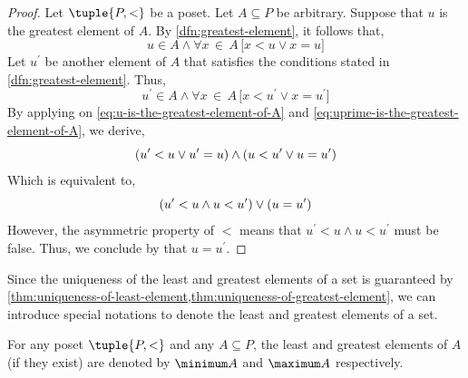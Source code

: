 \begin{proof}
    Let \( \tuple{P, <} \) be a poset. Let \( A \subseteq P \) be arbitrary. Suppose that \( u \) is the greatest element of \( A \).
    By \cref{dfn:greatest-element}, it follows that,
    \begin{equation}
        \label{eq:u-is-the-greatest-element-of-A}
        u \in A \land \forall x\,{\in}\,A \, \big[ x < u \lor x = u \big]
    \end{equation}
    Let \( u^{\prime} \) be another element of \( A \) that satisfies the conditions stated in \cref{dfn:greatest-element}. Thus,
    \begin{equation}
        \label{eq:uprime-is-the-greatest-element-of-A}
        u^{\prime} \in A \land \forall x\,{\in}\,A \, \big[ x < u^{\prime} \lor x = u^{\prime} \big]
    \end{equation}
    By applying  on \eqref{eq:u-is-the-greatest-element-of-A} and \eqref{eq:uprime-is-the-greatest-element-of-A},
    we derive,
    \begin{equation*}
        \mleft( u^{\prime} < u \lor u^{\prime} = u \mright) \land \mleft( u < u^{\prime} \lor u = u^{\prime} \mright)
    \end{equation*}
    Which is equivalent to,
    \begin{equation*}
        \mleft( u^{\prime} < u \land u < u^{\prime} \mright) \lor \mleft( u = u^{\prime} \mright)
    \end{equation*}
    However, the asymmetric property of \( < \) means that \( u^{\prime} < u \land u < u^{\prime} \) must be false. Thus, we conclude
    by  that \( u = u^{\prime} \).
\end{proof}

\vspace{0.2cm}
\noindent
Since the uniqueness of the least and greatest elements of a set is guaranteed by
\cref{thm:uniqueness-of-least-element,thm:uniqueness-of-greatest-element},
we can introduce special notations to denote the least and greatest elements of a set.

\begin{dfn}
    \label{dfn:least-element-notation}
    For any poset \( \tuple{P, <} \) and any \( A \subseteq P \), the least and greatest elements of \( A \) (if they exist)
    are denoted by \( \minimum A \) and \( \maximum A \) respectively.
\end{dfn}


